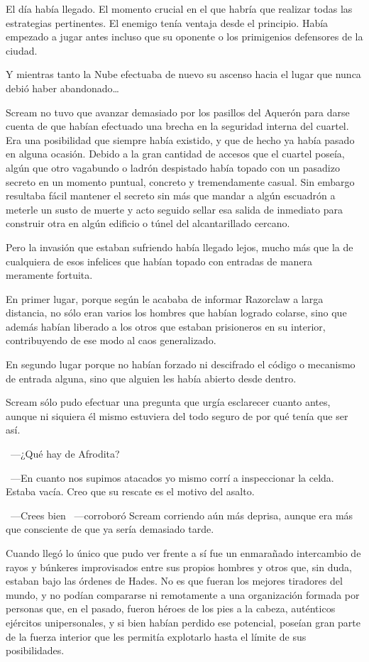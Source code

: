 El día había llegado. El momento crucial en el que habría que realizar todas las estrategias pertinentes. El enemigo tenía ventaja desde el principio. Había empezado a jugar antes incluso que su oponente o los primigenios defensores de la ciudad.

Y mientras tanto la Nube efectuaba de nuevo su ascenso hacia el lugar que nunca debió haber abandonado\dots

\fancyparbreak
Scream no tuvo que avanzar demasiado por los pasillos del Aquerón para darse cuenta de que habían efectuado una brecha en la seguridad interna del cuartel. Era una posibilidad que siempre había existido, y que de hecho ya había pasado en alguna ocasión. Debido a la gran cantidad de accesos que el cuartel poseía, algún que otro vagabundo o ladrón despistado había topado con un pasadizo secreto en un momento puntual, concreto y tremendamente casual. Sin embargo resultaba fácil mantener el secreto sin más que mandar a algún escuadrón a meterle un susto de muerte y acto seguido sellar esa salida de inmediato para construir otra en algún edificio o túnel del alcantarillado cercano.

Pero la invasión que estaban sufriendo había llegado lejos, mucho más que la de cualquiera de esos infelices que habían topado con entradas de manera meramente fortuita.

En primer lugar, porque según le acababa de informar Razorclaw a larga distancia, no sólo eran varios los hombres que habían logrado colarse, sino que además habían liberado a los otros que estaban prisioneros en su interior, contribuyendo de ese modo al caos generalizado.

En segundo lugar porque no habían forzado ni descifrado el código o mecanismo de entrada alguna, sino que alguien les había abierto desde dentro.

Scream sólo pudo efectuar una pregunta que urgía esclarecer cuanto antes, aunque ni siquiera él mismo estuviera del todo seguro de por qué tenía que ser así.
 
~---¿Qué hay de Afrodita?

~---En cuanto nos supimos atacados yo mismo corrí a inspeccionar la celda. Estaba vacía. Creo que su rescate es el motivo del asalto.

~---Crees bien ~---corroboró Scream corriendo aún más deprisa, aunque era más que consciente de que ya sería demasiado tarde.

Cuando llegó lo único que pudo ver frente a sí fue un enmarañado intercambio de rayos y búnkeres improvisados entre sus propios hombres y otros que, sin duda, estaban bajo las órdenes de Hades. No es que fueran los mejores tiradores del mundo, y no podían compararse ni remotamente a una organización formada por personas que, en el pasado, fueron héroes de los pies a la cabeza, auténticos ejércitos unipersonales, y si bien habían perdido ese potencial, poseían gran parte de la fuerza interior que les permitía explotarlo hasta el límite de sus posibilidades.

